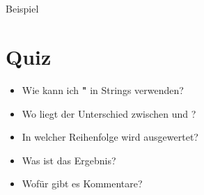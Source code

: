 \subsection{}
\begin{frame}
    \slidehead
    \begin{block}{Beispiel}
    \end{block}
\end{frame}

\livecoding

\section{Quiz}
\begin{frame}
    \slidehead
    \begin{itemize}[<+->]
        \item Wie kann ich \textbf{"} in Strings verwenden?
        \item Wo liegt der Unterschied zwischen  und ?
        \item In welcher Reihenfolge wird  ausgewertet?
        \item Was ist das Ergebnis?
        \item Wofür gibt es Kommentare?
    \end{itemize}
\end{frame}



